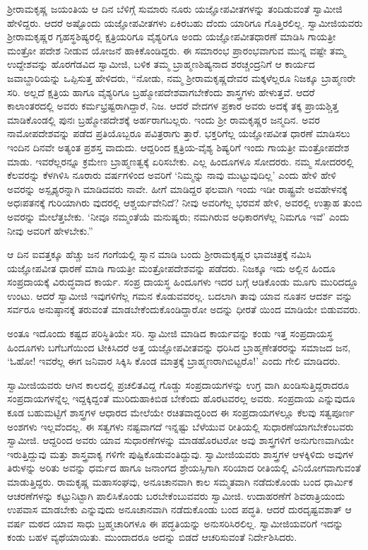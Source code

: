 ಶ್ರೀರಾಮಕೃಷ್ಣ ಜಯಂತಿಯ ಆ ದಿನ ಬೆಳಿಗ್ಗೆ ಸುಮಾರು ನೂರು ಯಜ್ಞೋಪವೀತಗಳನ್ನು ತಂದಿಡುವಂತೆ ಸ್ವಾಮೀಜಿ ಹೇಳಿದ್ದರು. ಆದರೆ ಅಷ್ಟೊಂದು ಯಜ್ಞೋಪವೀತಗಳು ಏಕಿರಬಹು ದೆಂದು ಯಾರಿಗೂ ಗೊತ್ತಿರಲಿಲ್ಲ. ಸ್ವಾಮೀಜಿಯವರು ಶ್ರೀರಾಮಕೃಷ್ಣರ ಗೃಹಸ್ಥಶಿಷ್ಯರಲ್ಲಿ ಕ್ಷತ್ರಿಯರಿಗೂ ವೈಶ್ಯರಿಗೂ ಅಂದು ಯಜ್ಞೋಪವೀತಧಾರಣೆ ಮಾಡಿಸಿ ಗಾಯತ್ರೀ ಮಂತ್ರೋ ಪದೇಶ ನೀಡುವ ಯೋಜನೆ ಹಾಕಿಕೊಂಡಿದ್ದರು. ಈ ಸಮಾರಂಭ ಪ್ರಾರಂಭವಾಗುವ ಮುನ್ನ ವಷ್ಟೇ ತಮ್ಮ ಉದ್ದೇಶವನ್ನು ಹೊರಗೆಡವಿದ ಸ್ವಾಮೀಜಿ, ಬಳಿಕ ತಮ್ಮ ಬ್ರಾಹ್ಮಣಶಿಷ್ಯನಾದ ಶರಚ್ಚಂದ್ರನಿಗೆ ಆ ಕಾರ್ಯದ ಜವಾಬ್ದಾರಿಯನ್ನು ಒಪ್ಪಿಸುತ್ತ ಹೇಳಿದರು, “ನೋಡು, ನಮ್ಮ ಶ್ರೀರಾಮಕೃಷ್ಣದೇವರ ಮಕ್ಕಳೆಲ್ಲರೂ ನಿಜಕ್ಕೂ ಬ್ರಾಹ್ಮಣರೇ ಸರಿ. ಅಲ್ಲದೆ ಕ್ಷತ್ರಿಯ ಹಾಗೂ ವೈಶ್ಯರಿಗೂ ಬ್ರಹ್ಮೋಪದೇಶವಾಗಬೇಕೆಂದು ಶಾಸ್ತ್ರಗಳು ಹೇಳುತ್ತವೆ. ಆದರೆ ಕಾಲಾಂತರದಲ್ಲಿ ಅವರು ಕರ್ಮಭ್ರಷ್ಟರಾಗಿದ್ದಾರೆ, ನಿಜ. ಆದರೆ ವೇದಗಳ ಪ್ರಕಾರ ಅವರು ಅದಕ್ಕೆ ತಕ್ಕ ಪ್ರಾಯಶ್ಚಿತ್ತ ಮಾಡಿಕೊಂಡಲ್ಲಿ ಪುನಃ ಬ್ರಹ್ಮೋಪದೇಶಕ್ಕೆ ಅರ್ಹರಾಗಬಲ್ಲರು. ಇಂದು ಶ್ರೀ ರಾಮಕೃಷ್ಣರ ಜನ್ಮದಿನ. ಅವರ ನಾಮೋಪದೇಶವನ್ನು ಪಡೆದ ಪ್ರತಿಯೊಬ್ಬರೂ ಪವಿತ್ರರಾಗು ತ್ತಾರೆ. ಭಕ್ತರಿಗೆಲ್ಲ ಯಜ್ಞೋಪವೀತ ಧಾರಣೆ ಮಾಡಿಸಲು ಇಂದಿನ ದಿನವೇ ಅತ್ಯಂತ ಪ್ರಶಸ್ತ ವಾದುದು. ಆದ್ದರಿಂದ ಕ್ಷತ್ರಿಯ-ವೈಶ್ಯ ಶಿಷ್ಯರಿಗೆ ಇಂದು ಗಾಯತ್ರೀ ಮಂತ್ರೋಪದೇಶ ಮಾಡು. ಇವರೆಲ್ಲರನ್ನೂ ಕ್ರಮೇಣ ಬ್ರಾಹ್ಮಣತ್ವಕ್ಕೆ ಏರಿಸಬೇಕು. ಎಲ್ಲ ಹಿಂದೂಗಳೂ ಸೋದರರು. ನಮ್ಮ ಸೋದರರಲ್ಲಿ ಕೆಲವರನ್ನು ಕೆಳಗಿಳಿಸಿ ನೂರಾರು ವರ್ಷಗಳಿಂದ ಅವರಿಗೆ ‘ನಿಮ್ಮನ್ನು ನಾವು ಮುಟ್ಟುವುದಿಲ್ಲ’ ಎಂದು ಹೇಳಿ ಹೇಳಿ ಅವರನ್ನು ಅಸ್ಪೃಶ್ಯರನ್ನಾಗಿ ಮಾಡಿದವರು ನಾವೇ. ಹೀಗೆ ಮಾಡಿದ್ದರ ಫಲವಾಗಿ ಇಂದು ಇಡೀ ರಾಷ್ಟ್ರವೇ ಅವಹೇಳನಕ್ಕೆ ಅಧಃಪತನಕ್ಕೆ ಗುರಿಯಾಗಿರು ವುದರಲ್ಲಿ ಆಶ್ಚರ್ಯವೇನಿದೆ? ನೀವು ಅವರಿಗೆಲ್ಲ ಭರವಸೆ ಹೇಳಿ, ಅವರಲ್ಲಿ ಉತ್ಸಾಹ ತುಂಬಿ ಅವರನ್ನು ಮೇಲೆತ್ತಬೇಕು. ‘ನೀವೂ ನಮ್ಮಂತೆಯೆ ಮನುಷ್ಯರು; ನಮಗಿರುವ ಅಧಿಕಾರಗಳೆಲ್ಲ ನಿಮಗೂ ಇವೆ’ ಎಂದು ನೀವು ಅವರಿಗೆ ಹೇಳಬೇಕು.”

ಆ ದಿನ ಐವತ್ತಕ್ಕೂ ಹೆಚ್ಚು ಜನ ಗಂಗೆಯಲ್ಲಿ ಸ್ನಾನ ಮಾಡಿ ಬಂದು ಶ್ರೀರಾಮಕೃಷ್ಣರ ಭಾವಚಿತ್ರಕ್ಕೆ ನಮಿಸಿ ಯಜ್ಞೋಪವೀತ ಧಾರಣೆ ಮಾಡಿ ಗಾಯತ್ರೀ ಮಂತ್ರೋಪದೇಶವನ್ನು ಪಡೆದರು. ನಿಜಕ್ಕೂ ಇದು ಅಲ್ಲಿನ ಹಿಂದೂ ಸಂಪ್ರದಾಯಕ್ಕೆ ವಿರುದ್ಧವಾದ ಕಾರ್ಯ. ಸಂಪ್ರ ದಾಯಸ್ಥ ಹಿಂದೂಗಳು ಇದರ ಬಗ್ಗೆ ಆಡಿಕೊಂಡು ಮೂಗು ಮುರಿದದ್ದೂ ಉಂಟು. ಆದರೆ ಸ್ವಾಮೀಜಿ ಇವುಗಳಿಗೆಲ್ಲ ಗಮನ ಕೊಡುವವರಲ್ಲ. ಬದಲಾಗಿ ತಾವು ಯಾವ ನೂತನ ಆದರ್ಶ ವನ್ನು ಸರ್ವರೂ ಅನುಷ್ಠಾನಕ್ಕೆ ತರುವಂತೆ ಮಾಡಬೇಕೆಂದುಕೊಂಡಿದ್ದಾರೋ ಅದನ್ನು ಧೀರತೆ ಯಿಂದ ಮಾಡಿಯೇ ಬಿಡುವವರು.

ಅಂತೂ ಇದೊಂದು ಕಷ್ಟದ ಪರಿಸ್ಥಿತಿಯೇ ಸರಿ. ಸ್ವಾಮೀಜಿ ಮಾಡಿದ ಕಾರ್ಯವನ್ನು ಕಂಡು ಇತ್ತ ಸಂಪ್ರದಾಯಸ್ಥ ಹಿಂದೂಗಳು ಬಗೆಬಗೆಯಿಂದ ಟೀಕಿಸಿದರೆ ಅತ್ತ ಯಜ್ಞೋಪವೀತವನ್ನು ಧರಿಸಿದ ಬ್ರಾಹ್ಮಣೇತರರನ್ನು ಸಮಾಜದ ಜನ, ‘ಓಹೋ! ಇವರೆಲ್ಲ ಈಗ ಜನಿವಾರ ಸಿಕ್ಕಿಸಿ ಕೊಂಡ ಮಾತ್ರಕ್ಕೆ ಬ್ರಾಹ್ಮಣರಾಗಿಬಿಟ್ಟರೊ!’ ಎಂದು ಗೇಲಿ ಮಾಡಿದರು.

ಸ್ವಾಮೀಜಿಯವರು ಆಗಿನ ಕಾಲದಲ್ಲಿ ಪ್ರಚಲಿತವಿದ್ದ ಗೊಡ್ಡು ಸಂಪ್ರದಾಯಗಳನ್ನು ಉಗ್ರ ವಾಗಿ ಖಂಡಿಸುತ್ತಿದ್ದರಾದರೂ ಸಂಪ್ರದಾಯಗಳನ್ನೆಲ್ಲ ಇದ್ದಕ್ಕಿದ್ದಂತೆ ಮುರಿದುಹಾಕಿಬಿಡ ಬೇಕೆಂದು ಹೊರಟವರಲ್ಲ ಅವರು. ಸಂಪ್ರದಾಯ ಎನ್ನುವುದೂ ಕೂಡ ಬಹುಮಟ್ಟಿಗೆ ಶಾಸ್ತ್ರಗಳ ಆಧಾರದ ಮೇಲೆಯೇ ರಚಿತವಾದ್ದರಿಂದ ಈ ಸಂಪ್ರದಾಯಗಳಲ್ಲೂ ಕೆಲವು ಸತ್ವಪೂರ್ಣ ಅಂಶಗಳು ಇಲ್ಲವೆಂದಲ್ಲ. ಈ ಸತ್ವಗಳು ನಷ್ಟವಾಗದೆ ಇನ್ನಷ್ಟು ಬೆಳೆಯುವ ರೀತಿಯಲ್ಲಿ ಸುಧಾರಣೆಯಾಗಬೇಕೆಂಬವರು ಸ್ವಾಮೀಜಿ. ಆದ್ದರಿಂದ ಅವರು ಯಾವ ಸುಧಾರಣೆಗಳನ್ನು ಮಾಡಹೊರಟರೋ ಅವು ಶಾಸ್ತ್ರಗಳಿಗೆ ಅನುಗುಣವಾಗಿಯೇ ಇರುತ್ತಿದ್ದುವು ಮತ್ತು ಶಾಸ್ತ್ರವಾಕ್ಯ ಗಳಿಗೇ ಪುಷ್ಟಿಕೊಡುವಂತಿದ್ದುವು. ಸ್ವಾಮೀಜಿಯವರು ಶಾಸ್ತ್ರಗಳ ಆಳಕ್ಕಿಳಿದು ಅವುಗಳ ತಿರುಳನ್ನು ಅರಿತು ಅವನ್ನು ಧರ್ಮದ ಹಾಗೂ ಜನಾಂಗದ ಶ್ರೇಯಸ್ಸಿಗಾಗಿ ಸರಿಯಾದ ರೀತಿಯಲ್ಲಿ ವಿನಿಯೋಗವಾಗುವಂತೆ ಮಾಡುತ್ತಿದ್ದರು. ರಾಮಕೃಷ್ಣ ಮಹಾಸಂಘವು, ಅನೂಚಾನವಾಗಿ ಕಾಲ ಸಮ್ಮತವಾಗಿ ನಡೆದುಕೊಂಡು ಬಂದ ಧಾರ್ಮಿಕ ಆಚರಣೆಗಳನ್ನು ಕಟ್ಟುನಿಟ್ಟಾಗಿ ಪಾಲಿಸಿಕೊಂಡು ಬರಬೇಕೆಂಬುವವರು ಸ್ವಾಮೀಜಿ. ಉದಾಹರಣೆಗೆ ಶಿವರಾತ್ರಿಯಂದು ಉಪವಾಸ ಮಾಡಬೇಕು ಎನ್ನುವುದು ಅನೂಚಾನವಾಗಿ ನಡೆದುಕೊಂಡು ಬಂದ ಪದ್ಧತಿ. ಆದರೆ ದುರದೃಷ್ಟವಶಾತ್ ಆ ವರ್ಷ ಮಠದ ಯಾವ ಸಾಧು ಬ್ರಹ್ಮಚಾರಿಗಳೂ ಈ ಪದ್ಧತಿಯನ್ನು ಅನುಸರಿಸಿರಲಿಲ್ಲ. ಸ್ವಾಮೀಜಿಯವರಿಗೆ ಇದನ್ನು ಕಂಡು ಬಹಳ ವ್ಯಥೆಯಾಯಿತು. ಮುಂದಾದರೂ ಅದನ್ನು ಬಿಡದೆ ಆಚರಿಸುವಂತೆ ನಿರ್ದೇಶಿಸಿದರು.

